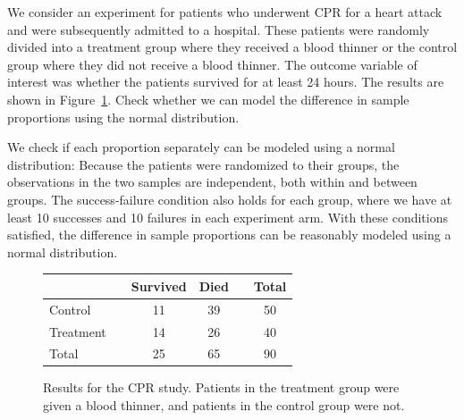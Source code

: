 \begin{examplewrap}
\begin{nexample}{We consider an experiment for patients
    who underwent CPR for a heart attack and were
    subsequently admitted to a
    hospital.
    These patients were randomly divided into a treatment
    group where they received a blood thinner or the control
    group where they did not receive a blood thinner.
    The outcome variable of interest was whether the
    patients survived for at least 24 hours.
    The results are shown in
    Figure~\ref{resultsForCPRStudyInSmallSampleSection}.
    Check whether we can model the difference in
    sample proportions using the normal distribution.}

  We check if each proportion separately can be
  modeled using a normal distribution:
      Because the patients were randomized to their groups,
      the observations in the two samples are independent,
      both within and between groups.
      The success-failure condition also holds for each group,
      where we have at least 10 successes and 10 failures in
      each experiment arm.
  With these conditions satisfied,
  the difference in sample proportions can be
  reasonably modeled using a normal distribution.
\end{nexample}
\end{examplewrap}

\begin{figure}[ht]
\centering
\begin{tabular}{lccccc}
\hline
			&& Survived 	& Died 	&& Total \\
\hline
Control		&& 11		& 39		&& 50 \\
Treatment		&& 14		& 26		&& 40 \\
\hline
Total			&& 25		& 65		&& 90 \\
\hline
\end{tabular}
\caption{Results for the CPR study.
    Patients in the treatment group were given
    a blood thinner, and patients in the control
    group were not.}
\label{resultsForCPRStudyInSmallSampleSection}
\end{figure}

